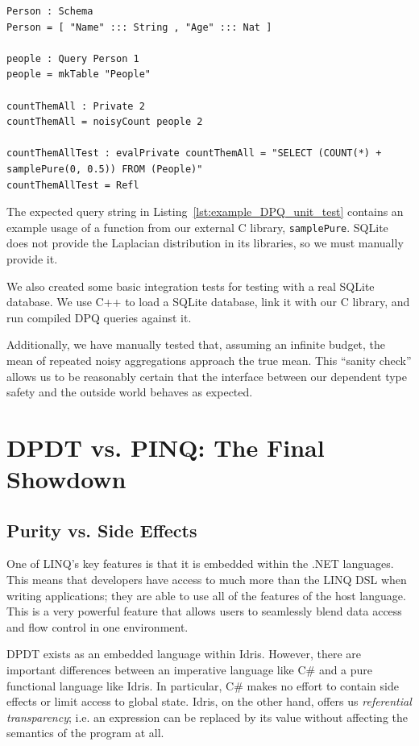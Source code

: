 \documentclass[12pt]{report}
\begin{document}
\begin{lstlisting}[float,caption={Unit test for noisyCount},label={lst:example_DPQ_unit_test}]
Person : Schema
Person = [ "Name" ::: String , "Age" ::: Nat ]

people : Query Person 1
people = mkTable "People"

countThemAll : Private 2
countThemAll = noisyCount people 2

countThemAllTest : evalPrivate countThemAll = "SELECT (COUNT(*) + samplePure(0, 0.5)) FROM (People)"
countThemAllTest = Refl
\end{lstlisting}

The expected query string in Listing~\ref{lst:example_DPQ_unit_test} contains an example usage of a function from our external C library, \texttt{samplePure}.
SQLite does not provide the Laplacian distribution in its libraries, so we must manually provide it.

We also created some basic integration tests for testing with a real SQLite database.
We use C++ to load a SQLite database, link it with our C library, and run compiled DPQ queries against it.

Additionally, we have manually tested that, assuming an infinite budget, the mean of repeated noisy aggregations approach the true mean.
This ``sanity check'' allows us to be reasonably certain that the interface between our dependent type safety and the outside world behaves as expected.

\section{DPDT vs. PINQ: The Final Showdown}

\subsection{Purity vs. Side Effects}

One of LINQ's key features is that it is embedded within the .NET languages.
This means that developers have access to much more than the LINQ DSL when writing applications; they are able to use all of the features of the host language.
This is a very powerful feature that allows users to seamlessly blend data access and flow control in one environment.

DPDT exists as an embedded language within Idris.
However, there are important differences between an imperative language like C\# and a pure functional language like Idris.
In particular, C\# makes no effort to contain side effects or limit access to global state.
Idris, on the other hand, offers us \textit{referential transparency}; i.e. an expression can be replaced by its value without affecting the semantics of the program at all.
\end{document}
